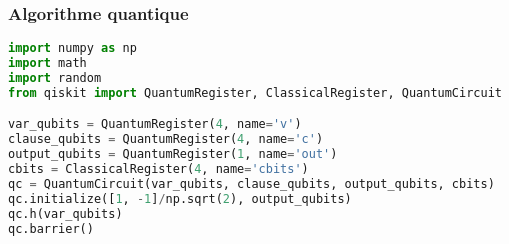\subsubsection*{Algorithme quantique}

\begin{lstlisting}[language=Python]
import numpy as np
import math
import random
from qiskit import QuantumRegister, ClassicalRegister, QuantumCircuit

var_qubits = QuantumRegister(4, name='v')
clause_qubits = QuantumRegister(4, name='c')
output_qubits = QuantumRegister(1, name='out')
cbits = ClassicalRegister(4, name='cbits')
qc = QuantumCircuit(var_qubits, clause_qubits, output_qubits, cbits)
qc.initialize([1, -1]/np.sqrt(2), output_qubits)
qc.h(var_qubits)
qc.barrier()

\end{lstlisting}
